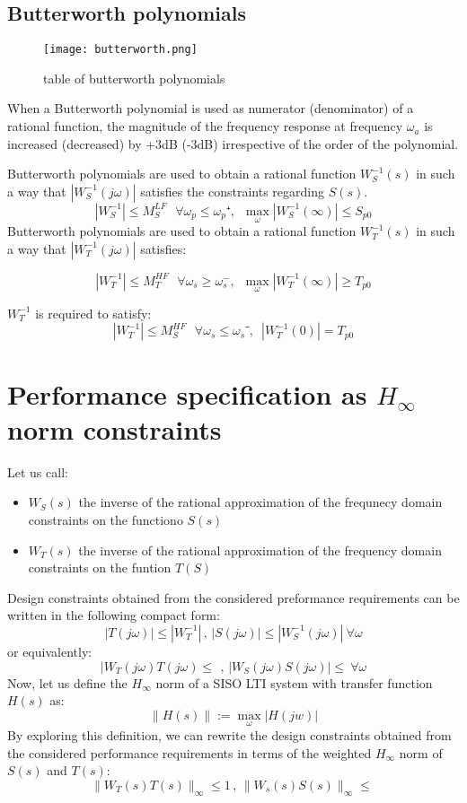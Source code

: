 \subsection{Butterworth polynomials}

\begin{figure}[H]
    \centering
    \texttt{[image: butterworth.png]}
    \caption{table of butterworth polynomials}
    \label{fig:butterworth}
\end{figure}

When a Butterworth polynomial is used as numerator (denominator) of a rational function, the magnitude of the frequency response at frequency $\omega_a$ is increased (decreased) by +3dB (-3dB) irrespective of the order of the polynomial.

Butterworth polynomials are used to obtain a rational function $W^{-1}_S(s)$ in such a way that $|W^{-1}_S(j\omega)|$ satisfies the constraints regarding $S(s)$.
\[
|W_S^{-1}| \leq M_S^{LF} \:\:\:\forall \omega_p \leq \omega_p⁺,\,\,\, \max\limits_{\omega}|W_S^{-1}(\infty)|\leq S_{p0}
\]
Butterworth polynomials are used to obtain a rational function $W_T^{-1}(s)$ in such a way that $|W^{-1}_T(j\omega)|$ satisfies:

\[
|W_T^{-1}| \leq M_T^{HF} \:\:\:\forall \omega_s \geq \omega_s^-,\,\,\, \max\limits_{\omega}|W_T^{-1}(\infty)|\geq T_{p0}
\]

$W_T^{-1}$ is required to satisfy:
\[
|W_T^{-1}| \leq M_S^{HF} \:\:\:\forall \omega_s \leq \omega_s⁻,\,\,\, |W_T^{-1}(0)|= T_{p0}
\]


\section{Performance specification as $H_{\infty}$ norm constraints}
Let us call:
\begin{itemize}
\item $W_S(s)$ the inverse of the rational approximation of the frequnecy domain constraints on the functiono $S(s)$
\item $W_T(s)$ the inverse of the rational approximation of the frequency domain constraints on the funtion $T(S)$
\end{itemize}

Design constraints obtained from the considered preformance requirements can be written in the following compact form:
\[
|T(j\omega)|\leq |W_T^{-1}|\,,\, |S(j\omega)| \leq |W_S^{-1}(j\omega)| \:\forall \omega
\]
or equivalently:
\[
|W_T(j\omega)T(j\omega) \leq \ \,,\, |W_S(j\omega)S(j\omega)|\leq \:\forall \omega
\]
Now, let us define the $H_{\infty}$ norm of a SISO LTI system with transfer function $H(s)$ as:
\[
\|H(s)\| := \max\limits_{\omega}|H(jw)|
\]
By exploring this definition, we can rewrite the design constraints obtained from the considered performance requirements in terms of the weighted $H_\infty$ norm of $S(s)$ and $T(s)$:
\[
\|W_T(s)T(s)\|_\infty \leq 1 \,,\, \|W_s(s)S(s)\|_\infty \leq \
\]


